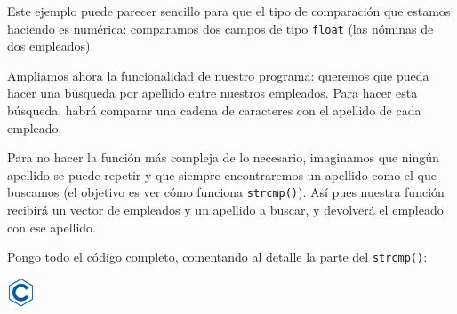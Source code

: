 \documentclass[
]{book}
\begin{document}
Este ejemplo puede parecer sencillo para que el tipo de comparación que estamos haciendo es numérica: comparamos dos campos de tipo \texttt{float} (las nóminas de dos empleados).

Ampliamos ahora la funcionalidad de nuestro programa: queremos que pueda hacer una búsqueda por apellido entre nuestros empleados. Para hacer esta búsqueda, habrá comparar una cadena de caracteres con el apellido de cada empleado.

Para no hacer la función más compleja de lo necesario, imaginamos que ningún apellido se puede repetir y que siempre encontraremos un apellido como el que buscamos (el objetivo es ver cómo funciona \texttt{strcmp()}). Así pues nuestra función recibirá un vector de empleados y un apellido a buscar, y devolverá el empleado con ese apellido.

Pongo todo el código completo, comentando al detalle la parte del \texttt{strcmp()}:

\includegraphics{./img/c.png}
\end{document}
